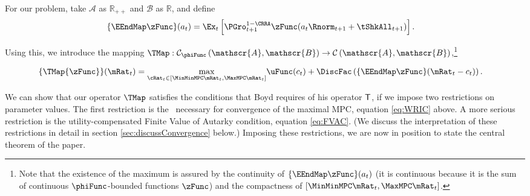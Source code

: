 \documentclass[./BufferStockTheory.tex]{subfiles}
\begin{document}
For our problem, take $\mathscr{A}$ as $\mathbb{R}_{++}$ and $\mathscr{B}$
as $\mathbb{R}$, and define
\begin{align*}
  \{\EEndMap \zFunc\}(a_{t})  & = \Ex_{t}\left[\PGro^{1-\CRRA}_{t+1} \zFunc(a_{t} \Rnorm_{t+1} + \tShkAll_{t+1})\right].
\end{align*}

Using this, we introduce the mapping \textit{$\TMap:\mathcal{C}_{\phiFunc }\left( \mathscr{A},\mathscr{B}\right) \rightarrow \mathcal{C}\left(
    \mathscr{A},\mathscr{B}\right) $},\footnote{Note that the existence of the maximum is assured by the continuity of $\{\EEndMap \zFunc\}(a_{t})$ (it is continuous because it is the sum of continuous $\phiFunc$-bounded functions $\zFunc$) and the compactness of $[\MinMinMPC \mRat_{t},  \MaxMPC \mRat_{t}]$.}
\begin{comment} %
(In the subtle case when $\MinMinMPC=0$, the compact interval could be revised as $ [(\MinMinMPC+\epsilon) \mRat_{t},
  \MaxMPC \mRat_{t}]$ where $\epsilon$ is a very small positive number because obviously $\MinMinMPC \mRat_{t}=0$ will not be the $\argmax$)
\end{comment}
\begin{align}
\{\TMap{\zFunc}\}(\mRat_{t})  & = \underset{{\cRat}_{t} \in
[\MinMinMPC \mRat_{t}, \MaxMPC \mRat_{t}]
} \max
\uFunc(c_{t})+\DiscFac \left( \{\EEndMap \zFunc \}(\mRat_{t}-c_{t}) \right)  \label{definitionmappingT}.
%
\end{align}


\begin{comment}
Unpacking the definitions, our mapping $\TMap$ can be written more explicitly as
\begin{align}
\{\TMap\zFunc\}(\mRat_{t})  & = \underset{\cRat_{t} \in [\MinMinMPC
  \mRat_{t}, \MaxMPC \mRat_{t}]} \max \left\{
\uFunc(c_{t})+\DiscFac \Ex_{t}\left[ {\PGro}_{t+1} ^{1-\CRRA }\zFunc(
{\aRat}_{t}\Rnorm_{t+1}+\tShkAll_{t+1}) \right] \right\}
.
\end{align}
\end{comment}

\hypertarget{Contraction-Conditions}{}

We can show that our operator $\TMap$ satisfies the conditions that
Boyd requires of his operator $\mathsf{T}$, if we impose two restrictions
on parameter values.  The first restriction is the \WRIC~necessary for
convergence of the maximal MPC, equation \eqref{eq:WRIC} above.  A
more serious restriction is the utility-compensated Finite Value of
Autarky condition, equation \eqref{eq:FVAC}.  (We discuss the
interpretation of these restrictions in detail in section
\ref{sec:discussConvergence} below.)  Imposing these restrictions, we
are now in position to state the central theorem of the paper.
\end{document}

